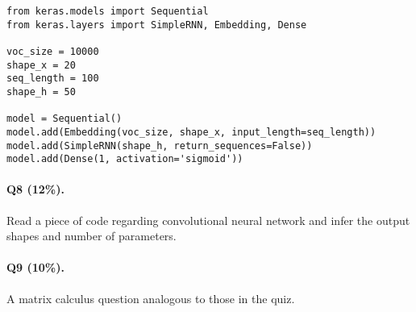 \documentclass[11pt]{article}
\numberwithin{equation}{section}
\begin{document}
\begin{lstlisting}
from keras.models import Sequential
from keras.layers import SimpleRNN, Embedding, Dense

voc_size = 10000 
shape_x = 20 
seq_length = 100 
shape_h = 50

model = Sequential()
model.add(Embedding(voc_size, shape_x, input_length=seq_length)) 
model.add(SimpleRNN(shape_h, return_sequences=False))
model.add(Dense(1, activation='sigmoid'))
\end{lstlisting}
\vspace{3mm}




\paragraph{Q8 (12\%).} 
Read a piece of code regarding convolutional neural network and infer the output shapes and number of parameters.



\paragraph{Q9 (10\%).} 
A matrix calculus question analogous to those in the quiz.




%

%
%
%
\end{document}
